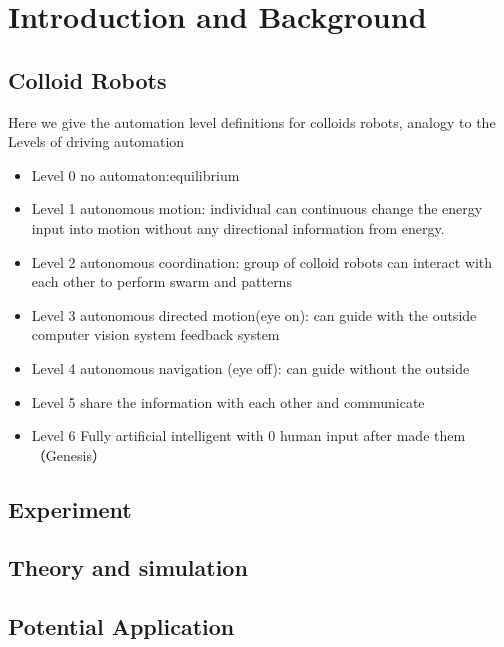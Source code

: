 \chapter{Introduction and Background}
\section{Colloid Robots}
Here we give the  automation level definitions for colloids robots,   analogy to the Levels of driving
automation\cite{taeihagh2019governing}
\begin{itemize}
    \item Level 0 no automaton:equilibrium  
    \item Level 1 autonomous  motion: individual can continuous change the energy input into motion without any directional information from energy.
    \item Level 2 autonomous coordination: group of colloid robots can interact with each other to perform swarm and patterns 
    \item Level 3  autonomous directed motion(eye on): can guide with the outside computer vision system feedback system 
    \item Level 4  autonomous navigation (eye off): can guide without the outside 
    \item Level 5 share the information with each other and communicate  
    \item Level 6  Fully artificial intelligent with 0 human input after made them（Genesis）
\end{itemize}
\section{Experiment }
\section{Theory and simulation}
\section{Potential Application }